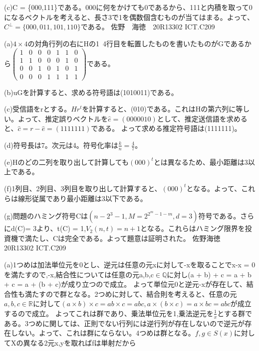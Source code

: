 \documentclass[11pt]{jsarticle}
\begin{document}
\par(c)C = \{000,111\}である。000に何をかけても0であるから、111と内積を取って0になるベクトルを考えると、長さ3で1を偶数個含むものが当てはまる。よって、$C^{\perp} = \{000,011,101,110\}$である。
\newpage
佐野　海徳　20R13302 ICT.C209\\
\par(a)$4 \times 4$の対角行列の右にHの1~4行目を転置したものを書いたものがGであるから$
\left(
\begin{array}{ccccccc}
1 & 0 & 0 & 0 & 1 & 1 & 0 \\
1 & 1 & 0 & 0 & 0 & 1 & 0 \\
0 & 0 & 1 & 0 & 1 & 0 & 1 \\
0 & 0 & 0 & 1 & 1 & 1 & 1
\end{array}
\right)$である。
\par(b)uGを計算すると、求める符号語は(1010011)である。
\par(c)受信語をrとする。$Hr^t$を計算すると、(010)である。これはHの第六列に等しい。よって、推定誤りベクトルを$\hat{e} = (0000010)$として、推定送信語を求めると、$\hat{c} = r - \hat{e} = (1111111)$である。
よって求める推定符号語は(1111111)。
\par(d)符号長は7。次元は4。符号化率は$\frac{k}{n} = \frac{4}{7}$。
\par(e)Hのどの二列を取り出して計算しても$(000)^t$とは異なるため、最小距離は3以上である。
\par(f)1列目、2列目、3列目を取り出して計算すると、$(000)^t$となる。よって、これらは線形従属であり最小距離は3以下である。
\par(g)問題のハミング符号Cは$(n - 2^3-1,M = 2^{2^m - 1 - m},d = 3)$符号である。さらにd(C)= 3より、t(C) = 1,$V_2(n,t) = n + 1$となる。これらはハミング限界を投資機で満たし、Cは完全である。よって題意は証明された。\newpage
佐野海徳　20R13302 ICT.C209\\
\par(a)1つめは加法単位元を0とし、逆元は任意の元xに対して-xを取ることでx-x = 0を満たすので,-x,結合性については任意の元a,b,c$\in \mathbb{Q}$に対し(a + b) + c = a + b + c = a + (b + c)が成り立つので成立。
よって単位元0と逆元-xが存在して、結合性も満たすので群となる。2つめに対して、結合則を考えると、任意の元$a,b,c \in \mathbb{R}$に対して$(a \times b) \times c = ab \times c = abc, a \times (b \times c) = a \times bc = abc$が成立するので成立。
よってこれは群であり、乗法単位元を1,乗法逆元を$\frac{1}{x}$とする群である。3つめに関しては、正則でない行列には逆行列が存在しないので逆元が存在しない。よって、これは群にならない。4つめは群となる。$f,g \in S(x)$に対してXの異なる2元x,yを取ればfは単射だから
\end{document}
